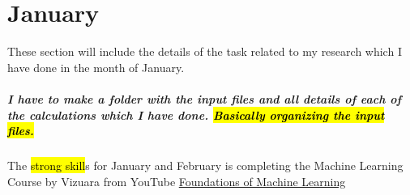 \chapter{January}
\label{chap:Jan}


These section will include the details of the task related to my research which I have done in the month of January.
\paragraph{I have to make a folder with the input files and all details of each of the calculations which I have done. \hl{Basically organizing the input files.}}

The \hl{strong skill}s for January and February is completing the Machine Learning Course by Vizuara from YouTube \href{https://youtube.com/playlist?list=PLPTV0NXA_ZSiLI0ZfZYbHM2FPHKIuMW6K&si=ahBRjJkP5Mmh6D88}{Foundations of Machine Learning}


